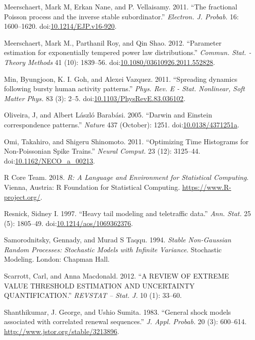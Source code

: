 \documentclass[smallextended]{svjour3}       %
\begin{document}
\hypertarget{ref-Meerschaert2010b}{}
Meerschaert, Mark M, Erkan Nane, and P. Vellaisamy. 2011. ``The
fractional Poisson process and the inverse stable subordinator.''
\emph{Electron. J. Probab.} 16: 1600--1620.
doi:\href{https://doi.org/10.1214/EJP.v16-920}{10.1214/EJP.v16-920}.

\hypertarget{ref-MeerschaertRoyQin}{}
Meerschaert, Mark M., Parthanil Roy, and Qin Shao. 2012. ``Parameter
estimation for exponentially tempered power law distributions.''
\emph{Commun. Stat. - Theory Methods} 41 (10): 1839--56.
doi:\href{https://doi.org/10.1080/03610926.2011.552828}{10.1080/03610926.2011.552828}.

\hypertarget{ref-Min2010}{}
Min, Byungjoon, K. I. Goh, and Alexei Vazquez. 2011. ``Spreading
dynamics following bursty human activity patterns.'' \emph{Phys. Rev. E
- Stat. Nonlinear, Soft Matter Phys.} 83 (3): 2--5.
doi:\href{https://doi.org/10.1103/PhysRevE.83.036102}{10.1103/PhysRevE.83.036102}.

\hypertarget{ref-Oliveira2005}{}
Oliveira, J, and Albert László Barabási. 2005. ``Darwin and Einstein
correspondence patterns.'' \emph{Nature} 437 (October): 1251.
doi:\href{https://doi.org/10.0138/4371251a}{10.0138/4371251a}.

\hypertarget{ref-Omi2011}{}
Omi, Takahiro, and Shigeru Shinomoto. 2011. ``Optimizing Time Histograms
for Non-Poissonian Spike Trains.'' \emph{Neural Comput.} 23 (12):
3125--44.
doi:\href{https://doi.org/10.1162/NECO_a_00213}{10.1162/NECO\_a\_00213}.

\hypertarget{ref-R}{}
R Core Team. 2018. \emph{R: A Language and Environment for Statistical
Computing}. Vienna, Austria: R Foundation for Statistical Computing.
\url{https://www.R-project.org/}.

\hypertarget{ref-Resnick97}{}
Resnick, Sidney I. 1997. ``Heavy tail modeling and teletraffic data.''
\emph{Ann. Stat.} 25 (5): 1805--49.
doi:\href{https://doi.org/10.1214/aos/1069362376}{10.1214/aos/1069362376}.

\hypertarget{ref-SamorodnitskyTaqqu}{}
Samorodnitsky, Gennady, and Murad S Taqqu. 1994. \emph{Stable
Non-Gaussian Random Processes: Stochastic Models with Infinite
Variance}. Stochastic Modeling. London: Chapman Hall.

\hypertarget{ref-Scarrott12}{}
Scarrott, Carl, and Anna Macdonald. 2012. ``A REVIEW OF EXTREME VALUE
THRESHOLD ESTIMATION AND UNCERTAINTY QUANTIFICATION.'' \emph{REVSTAT --
Stat. J.} 10 (1): 33--60.

\hypertarget{ref-Sumita1983}{}
Shanthikumar, J. George, and Ushio Sumita. 1983. ``General shock models
associated with correlated renewal sequences.'' \emph{J. Appl. Probab.}
20 (3): 600--614. \url{http://www.jstor.org/stable/3213896}.
\end{document}
